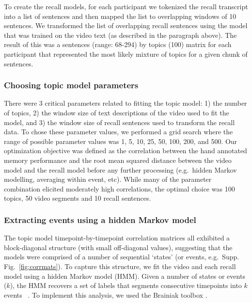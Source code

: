 \documentclass{article}
\begin{document}
To create the recall models, for each participant we tokenized the recall transcript into a list of sentences and then mapped the list to overlapping windows of 10 sentences.  We transformed the list of overlapping recall sentences using the model that was trained on the video text (as described in the paragraph above). The result of this was a sentences (range: 68-294) by topics (100) matrix for each participant that represented the most likely mixture of topics for a given chunk of sentences.

\subsubsection{Choosing topic model parameters}
There were 3 critical parameters related to fitting the topic model: 1) the number of topics, 2) the window size of text descriptions of the video used to fit the model, and 3) the window size of recall sentences used to transform the recall data.  To chose these parameter values, we performed a grid search where the range of possible parameter values was 1, 5, 10, 25, 50, 100, 200, and 500. Our optimization objective was defined as the correlation between the hand annotated memory performance and the root mean squared distance between the video model and the recall model before any further processing (e.g.\ hidden Markov modelling, averaging within event, etc). While many of the parameter combination elicited moderately high correlations, the optimal choice was 100 topics, 50 video segments and 10 recall sentences.

\subsubsection{Extracting events using a hidden Markov model}
The topic model timepoint-by-timepoint correlation matrices all exhibited a block-diagonal structure (with small off-diagonal values), suggesting that the models were comprised of a number of sequential `states' (or events, e.g.\ Supp. Fig.~\ref{fig:corrmats}). To capture this structure, we fit the video and each recall model using a hidden Markov model (HMM). Given a number of states or events ($k$), the HMM recovers a set of labels that segments consecutive timepoints into $k$ events ~\citep{Rabi89, BaldEtal17}. To implement this analysis, we used the Brainiak toolbox \citep{BaldEtal17, Brainiak}.
\end{document}
